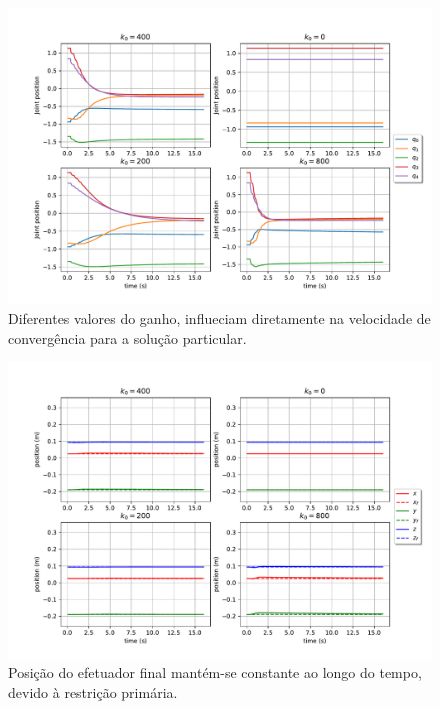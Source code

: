 \begin{figure}
	\centering
	\includegraphics[width=\textwidth]{./Images/2024-06-11-09-23-42/joint_states_joint_distance.pdf}
	\caption{Diferentes valores do ganho, influeciam diretamente na velocidade de convergência para a solução particular.}\label{fig:exp1-joint-states}
\end{figure}

\begin{figure}
	\centering
	\includegraphics[width=\textwidth]{./Images/2024-06-11-09-23-42/position_joint_distance.pdf}
	\caption{Posição do efetuador final mantém-se constante ao longo do tempo, devido à restrição primária.}\label{fig:exp1-position}
\end{figure}


